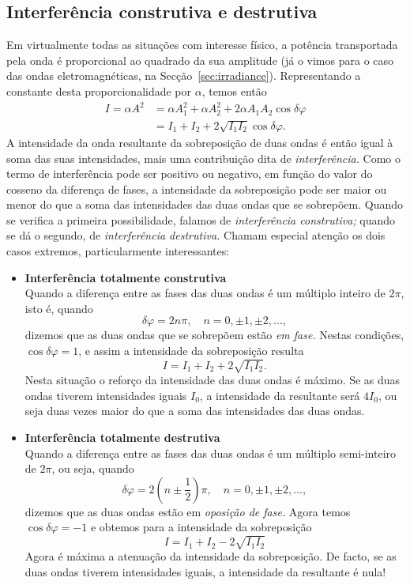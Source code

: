 \subsection{Interferência construtiva e destrutiva}
\label{sec:condint}
Em virtualmente todas as situações com interesse físico, a potência transportada
pela onda é proporcional ao quadrado da sua amplitude (já o vimos para o caso
das ondas eletromagnéticas, na Secção~\ref{sec:irradiance}). Representando a
constante desta proporcionalidade por $\alpha$, temos então
\begin{align}
I=\alpha A^2&=\alpha A_1^2+\alpha A_2^2 + 2\alpha A_1 A_2\cos\delta\varphi
\nonumber\\
&=I_1+I_2+2\sqrt{I_1I_2}\cos\delta\varphi.\label{eq:superp1}
\end{align}
A intensidade da onda resultante da sobreposição de duas ondas é então igual à
soma das suas intensidades, mais uma contribuição dita de \emph{interferência.}
Como o termo de interferência pode ser positivo ou negativo, em função do valor
do cosseno da diferença de fases, a intensidade da sobreposição pode ser maior
ou menor do que a soma das intensidades das duas ondas que se sobrepõem.  Quando
se verifica a primeira possibilidade, falamos de \emph{interferência
construtiva;} quando se dá o segundo, de \emph{interferência destrutiva.}
Chamam especial atenção os dois casos extremos, particularmente interessantes:
\begin{itemize}
\item \textbf{Interferência totalmente construtiva}\\
Quando a diferença entre as fases das duas ondas é um múltiplo inteiro de $2\pi$,
isto é, quando
\begin{equation*}
\delta\varphi = 2n\pi,\quad n=0,\pm1,\pm2,\ldots,
\end{equation*}
dizemos que as duas ondas que se sobrepõem estão \emph{em fase.} Nestas
condições, $\cos\delta\varphi=1$, e assim a intensidade da sobreposição resulta
\begin{equation*}
I=I_1 + I_2+2\sqrt{I_1I_2}.
\end{equation*}
Nesta situação o reforço da intensidade das duas ondas é máximo. Se as duas ondas
tiverem intensidades iguais $I_0$, a intensidade da resultante será $4I_0$, ou
seja duas vezes maior do que a soma das intensidades das duas ondas.
\item \textbf{Interferência totalmente destrutiva}\\
Quando a diferença entre as fases das duas ondas é um múltiplo semi-inteiro de
$2\pi$, ou seja, quando
\begin{equation*}
\delta\varphi = 2\left(n\pm\frac{1}{2}\right)\pi,\quad n=0,\pm1,\pm2,\ldots,
\end{equation*}
dizemos que as duas ondas estão em \emph{oposição de fase.} Agora temos
$\cos\delta\varphi=-1$ e obtemos para a intensidade da sobreposição
\begin{equation*}
I=I_1 + I_2 - 2\sqrt{I_1I_2}
\end{equation*}
Agora é máxima a atenuação da intensidade da sobreposição. De facto, se as duas
ondas tiverem intensidades iguais, a intensidade da resultante é nula!
\end{itemize}

